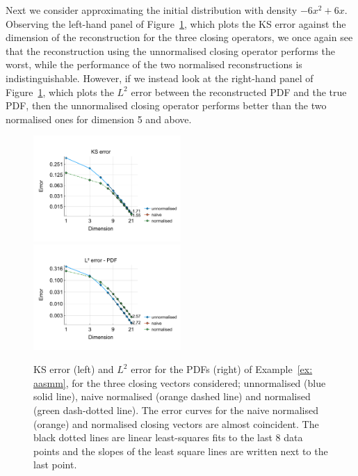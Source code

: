 \begin{example}\label{ex: aasmm}
	Next we consider approximating the initial distribution with density \(-6x^2+6x\). Observing the left-hand panel of Figure~\ref{fig: fun 6 ks error qbdrap closing vecs}, which plots the KS error against the dimension of the reconstruction for the three closing operators, we once again see that the reconstruction using the unnormalised closing operator performs the worst, while the performance of the two normalised reconstructions is indistinguishable. However, if we instead look at the right-hand panel of Figure~\ref{fig: fun 6 ks error qbdrap closing vecs}, which plots the \(L^2\) error between the reconstructed PDF and the true PDF, then the unnormalised closing operator performs better than the two normalised ones for dimension 5 and above. 
\begin{figure}[h]
	\centering
	\includegraphics[width=0.5\textwidth,trim={0.5cm 0.8cm 0.2cm 1.25cm},clip]{chapter6/figs/qbdrap_closing_vec/fun6/ks_error_formatted.pdf}%
	\includegraphics[width=0.5\textwidth,trim={0.5cm 0.8cm 0.2cm 1.25cm},clip]{chapter6/figs/qbdrap_closing_vec/fun6/l2_pdf_error_formatted.pdf}
	\caption{KS error (left) and \(L^2\) error for the PDFs (right) of Example~\ref{ex: aasmm}, for the three closing vectors considered; unnormalised (blue solid line), naive normalised (orange dashed line) and normalised (green dash-dotted line). The error curves for the naive normalised (orange) and normalised closing vectors are almost coincident. The black dotted lines are linear least-squares fits to the last 8 data points and the slopes of the least square lines are written next to the last point.}
	\label{fig: fun 6 ks error qbdrap closing vecs}
\end{figure}


\end{example}

